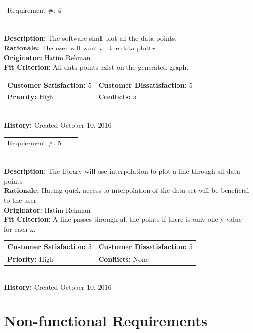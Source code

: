 \documentclass[12pt, titlepage]{article}
\begin{document}
\begin{reqbox}
\begin{tabular}{ccc}Requirement \#: 4
\end{tabular} \\
\textbf{Description:} The software shall plot all the data points.\\
\textbf{Rationale:} The user will want all the data plotted. \\
\textbf{Originator:} Hatim Rehman \\
\textbf{Fit Criterion:} All data points exist on the generated graph.\\
\begin{tabular}{ll}
\textbf{Customer Satisfaction:} 5 & \textbf{Customer Dissatisfaction:} 5 \\
\textbf{Priority:} High & \textbf{Conflicts:} 5\\
\end{tabular} \\
\textbf{History:} Created October 10, 2016
\end{reqbox}

\begin{reqbox}
\begin{tabular}{ccc}Requirement \#: 5
\end{tabular} \\
\textbf{Description:} The library will use interpolation to plot a line through all data points\\
\textbf{Rationale:} Having quick access to interpolation of the data set will be beneficial to the user \\
\textbf{Originator:} Hatim Rehman \\
\textbf{Fit Criterion:} A line passes through all the points if there is only one y value for each x.\\
\begin{tabular}{ll}
\textbf{Customer Satisfaction:} 5 & \textbf{Customer Dissatisfaction:} 5 \\
\textbf{Priority:} High & \textbf{Conflicts:} None\\
\end{tabular} \\
\textbf{History:} Created October 10, 2016
\end{reqbox}
\clearpage

\section{Non-functional Requirements} %
\end{document}
